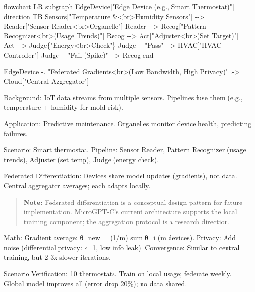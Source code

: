 \documentclass[
]{article}
\newenvironment{Shaded}{}{}
\newcommand{\NormalTok}[1]{#1}
\begin{document}
\begin{Shaded}
\begin{Highlighting}[]
\NormalTok{flowchart LR}
\NormalTok{    subgraph EdgeDevice["Edge Device (e.g., Smart Thermostat)"]}
\NormalTok{        direction TB}
\NormalTok{        Sensors["Temperature \&\textless{}br\textgreater{}Humidity Sensors"] {-}{-}\textgreater{} Reader["Sensor Reader\textless{}br\textgreater{}Organelle"]}
\NormalTok{        Reader {-}{-}\textgreater{} Recog["Pattern Recognizer\textless{}br\textgreater{}(Usage Trends)"]}
\NormalTok{        Recog {-}{-}\textgreater{} Act["Adjuster\textless{}br\textgreater{}(Set Target)"]}
\NormalTok{        Act {-}{-}\textgreater{} Judge\{"Energy\textless{}br\textgreater{}Check"\}}
\NormalTok{        Judge {-}{-} "Pass" {-}{-}\textgreater{} HVAC["HVAC Controller"]}
\NormalTok{        Judge {-}{-} "Fail (Spike)" {-}{-}\textgreater{} Recog}
\NormalTok{    end}
    
\NormalTok{    EdgeDevice {-}. "Federated Gradients\textless{}br\textgreater{}(Low Bandwidth, High Privacy)" .{-}\textgreater{} Cloud["Central Aggregator"]}
\end{Highlighting}
\end{Shaded}

Background: IoT data streams from multiple sensors. Pipelines fuse them
(e.g., temperature + humidity for mold risk).

Application: Predictive maintenance. Organelles monitor device health,
predicting failures.

Scenario: Smart thermostat. Pipeline: Sensor Reader, Pattern Recognizer
(usage trends), Adjuster (set temp), Judge (energy check).

Federated Differentiation: Devices share model updates (gradients), not
data. Central aggregator averages; each adapts locally.

\begin{quote}
\textbf{Note:} Federated differentiation is a conceptual design pattern
for future implementation. MicroGPT-C's current architecture supports
the local training component; the aggregation protocol is a research
direction.
\end{quote}

Math: Gradient average: θ\_new = (1/m) sum θ\_i (m devices). Privacy:
Add noise (differential privacy: ε=1, low info leak). Convergence:
Similar to central training, but 2-3x slower iterations.

Scenario Verification: 10 thermostats. Train on local usage; federate
weekly. Global model improves all (error drop 20\%); no data shared.
\end{document}

